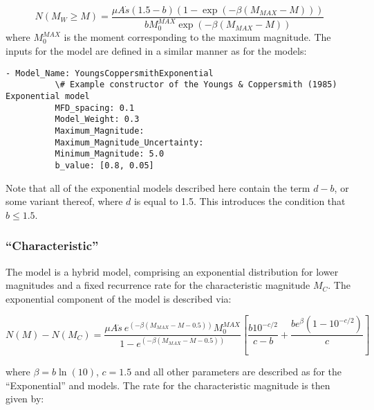 \begin{equation}
N \left( {M_W \geq M} \right) = \frac{\mu A \dot{s} \left( {1.5 - b} \right) \left( {1 - \exp \left( {-\beta \left( {M_{MAX} - M} \right)} \right)} \right)}{b M_{0}^{MAX} \exp \left( {-\beta \left( {M_{MAX} - M} \right)} \right)}
\end{equation}
where $M_0^{MAX}$ is the moment corresponding to the maximum magnitude. The inputs for the model are defined in a similar manner as for the \cite{AndersonLuco1983} models:

\begin{Verbatim}[frame=single, commandchars=\\\{\}, fontsize=\scriptsize]
        - Model_Name: YoungsCoppersmithExponential
          \# Example constructor of the Youngs & Coppersmith (1985) Exponential model
          MFD_spacing: 0.1
          Model_Weight: 0.3
          Maximum_Magnitude:
          Maximum_Magnitude_Uncertainty:
          Minimum_Magnitude: 5.0
          b_value: [0.8, 0.05]
\end{Verbatim}

Note that all of the exponential models described here contain the term $d - b$, or some variant thereof, where $d$ is equal to 1.5. This introduces the condition that $b \leq 1.5$. 

\subsubsection{\cite{YoungsCoppersmith1985} ``Characteristic''}

The \cite{YoungsCoppersmith1985} model is a hybrid model, comprising an exponential distribution for lower magnitudes and a fixed recurrence rate for the characteristic magnitude $M_C$. The exponential component of the model is described via:

\begin{equation}
N \left( M \right) - N \left( {M_C} \right) = \frac{\mu A \dot{s}\ e^{\left( {-\beta \left( {M_{MAX} - M - 0.5} \right)}\right)} M_{0}^{MAX}}{1 - e^{\left( {-\beta \left( {M_{MAX} - M - 0.5} \right)} \right)}} 
 \left[ {\frac{b10^{-c/2}}{c - b} + \frac{b e^{\beta}\left({1 - 10^{-c/2}}\right)}{c}} \right]\end{equation}

where $\beta = b \ln \left( {10} \right)$, $c = 1.5$ and all other parameters are described as for the \cite{YoungsCoppersmith1985} ``Exponential'' and \cite{AndersonLuco1983} models. The rate for the characteristic magnitude is then given by:

